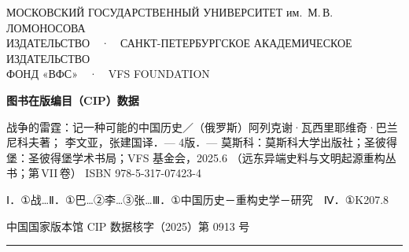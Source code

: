 \thispagestyle{empty}
\begingroup
\footnotesize
\linespread{1.22}\selectfont
\centering
\begin{minipage}[t][\dimexpr\textheight-24pt\relax][s]{\textwidth}
\centering

{\sffamily\scriptsize\color{pencil}
МОСКОВСКИЙ ГОСУДАРСТВЕННЫЙ УНИВЕРСИТЕТ им.\ М.\,В.\,ЛОМОНОСОВА\\
ИЗДАТЕЛЬСТВО\ \ ·\ \ САНКТ-ПЕТЕРБУРГСКОЕ АКАДЕМИЧЕСКОЕ ИЗДАТЕЛЬСТВО\\
ФОНД «ВФС»\ \ ·\ \ VFS FOUNDATION\par}

\vspace{3.2mm}
{\bfseries 图书在版编目（CIP）数据\par}
\vspace{2mm}

\begin{minipage}{0.94\textwidth}
\raggedright
战争的雷霆：记一种可能的中国历史／（俄罗斯）阿列克谢·瓦西里耶维奇·巴兰尼科夫著；
李文亚，张建国译．— 4版．— 莫斯科：莫斯科大学出版社；圣彼得堡：圣彼得堡学术书局；VFS 基金会，2025.6
（远东异端史料与文明起源重构丛书；第\,VII\,卷）
ISBN 978-5-317-07423-4

\vspace{1.4mm}
\hspace{2em}Ⅰ．①战…\quad Ⅱ．①巴…②李…③张…\quad Ⅲ．①中国历史－重构史学－研究\ \ Ⅳ．①K207.8

\vspace{1.4mm}
\hspace{2em}中国国家版本馆 CIP 数据核字（2025）第 0913 号
\end{minipage}

\vspace{3.2mm}
{\color{rulegrey}\rule{0.94\textwidth}{0.3pt}}
\vspace{2.4mm}


\end{minipage}
